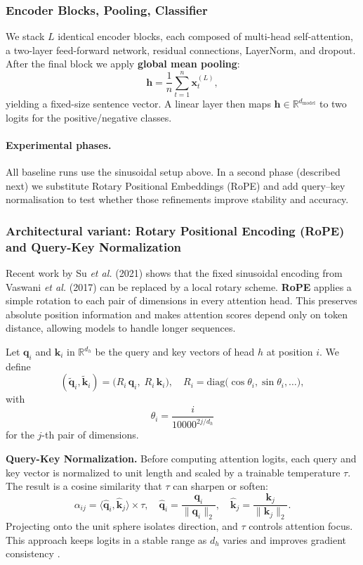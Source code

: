 \documentclass[twocolumn,superscriptaddress,aps]{revtex4-1}
\begin{document}
\subsubsection{Encoder Blocks, Pooling, Classifier}
We stack $L$ identical encoder blocks, each composed of multi-head self-attention, a two-layer feed-forward network, residual connections, LayerNorm, and dropout.  
After the final block we apply \textbf{global mean pooling}:
\[
\mathbf{h}=\frac1n\sum_{t=1}^{n}\mathbf{x}^{(L)}_t,
\]
yielding a fixed-size sentence vector.  
A linear layer then maps $\mathbf{h}\in\mathbb{R}^{d_{\text{model}}}$ to two logits for the positive/negative classes.

\paragraph{Experimental phases.}  
All baseline runs use the sinusoidal setup above.  In a second phase (described next) we substitute Rotary Positional Embeddings (RoPE) and add query–key normalisation to test whether those refinements improve stability and accuracy.

\subsubsection{Architectural variant: Rotary Positional Encoding (RoPE) and Query-Key Normalization}
\label{subsec:rope_qknorm}

Recent work by Su \emph{et al.} (2021)\cite{su2021rope} shows that the fixed sinusoidal encoding from Vaswani \emph{et al.} (2017)\cite{vaswani2017attention} can be replaced by a local rotary scheme. \textbf{RoPE} applies a simple rotation to each pair of dimensions in every attention head. This preserves absolute position information and makes attention scores depend only on token distance, allowing models to handle longer sequences.

Let \(\mathbf q_i\) and \(\mathbf k_i\) in \(\mathbb{R}^{d_h}\) be the query and key vectors of head \(h\) at position \(i\). We define
\[
(\tilde{\mathbf q}_i,\tilde{\mathbf k}_i)
   = \bigl(R_i\,\mathbf q_i,\;R_i\,\mathbf k_i\bigr),
\quad
R_i=\mathrm{diag}\bigl(\cos\theta_i,\sin\theta_i,\dots\bigr),
\]
with
\[
\theta_i = \frac{i}{10000^{2j/d_h}}
\]
for the \(j\)-th pair of dimensions.

\medskip
\noindent\textbf{Query-Key Normalization.}  
Before computing attention logits, each query and key vector is normalized to unit length and scaled by a trainable temperature \(\tau\). The result is a cosine similarity that \(\tau\) can sharpen or soften:
\[
\alpha_{ij}
= \langle \hat{\mathbf q}_i,\hat{\mathbf k}_j \rangle \times \tau,
\quad
\hat{\mathbf q}_i = \frac{\mathbf q_i}{\|\mathbf q_i\|_2},
\quad
\hat{\mathbf k}_j = \frac{\mathbf k_j}{\|\mathbf k_j\|_2}.
\]
Projecting onto the unit sphere isolates direction, and \(\tau\) controls attention focus. This approach keeps logits in a stable range as \(d_h\) varies and improves gradient consistency \cite{henry-etal-2020-query}.
\end{document}
